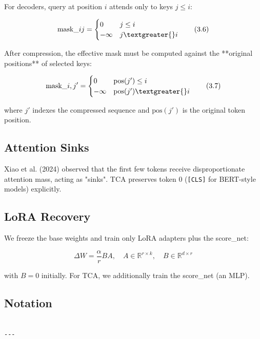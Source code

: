 For decoders, query at position $i$ attends only to keys $j \leq i$:

\[
\text{mask}\_{ij} = \begin{cases} 0 & j \leq i \\ -\infty & j \textgreater{} i \end{cases}
\tag{3.6}
\]

After compression, the effective mask must be computed against the **original 
positions** of selected keys:

\[
\text{mask}\_{i, j'} = \begin{cases} 0 & \text{pos}(j') \leq i \\ -\infty & \text{pos}(j') \textgreater{} i \end{cases}
\tag{3.7}
\]

where $j'$ indexes the compressed sequence and $\text{pos}(j')$ is the 
original token position.

\subsection{Attention Sinks}

Xiao et al. (2024) observed that the first few tokens receive disproportionate 
attention mass, acting as "sinks". TCA preserves token 0 (\texttt{[CLS]} for BERT-style 
models) explicitly.

\subsection{LoRA Recovery}

We freeze the base weights and train only LoRA adapters plus the score\_net:

\[
\Delta W = \frac{\alpha}{r} B A, \quad A \in \mathbb{R}^{r \times k}, \quad B \in \mathbb{R}^{d \times r}
\tag{3.8}
\]

with $B = 0$ initially. For TCA, we additionally train the score\_net (an MLP).



\subsection{Notation}

\begin{lstlisting}

---
\end{lstlisting}